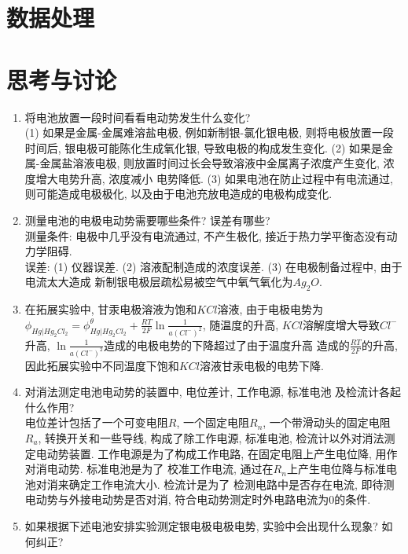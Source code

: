 \documentclass[a4paper]{article}
\begin{document}
\section{数据处理}

\newpage
\section{思考与讨论}
\begin{enumerate}
	\item 将电池放置一段时间看看电动势发生什么变化?\\
	(1) 如果是金属-金属难溶盐电极, 例如新制银-氯化银电极, 则将电极放置一段时间后, 
	银电极可能陈化生成氧化银, 导致电极的构成发生变化. (2) 如果是金属-金属盐溶液电极, 
	则放置时间过长会导致溶液中金属离子浓度产生变化, 浓度增大电势升高, 浓度减小
	电势降低. (3) 如果电池在防止过程中有电流通过, 则可能造成电极极化, 
	以及由于电池充放电造成的电极构成变化.
	\item 测量电池的电极电动势需要哪些条件? 误差有哪些?\\
	测量条件: 电极中几乎没有电流通过, 不产生极化, 接近于热力学平衡态没有动力学阻碍.\\
	误差: (1) 仪器误差. (2) 溶液配制造成的浓度误差. (3) 在电极制备过程中, 由于电流太大造成
	新制银电极层疏松易被空气中氧气氧化为$Ag_{2}O$.
	\item 在拓展实验中, 甘汞电极溶液为饱和$KCl$溶液, 由于电极电势为$\phi_{Hg|Hg_{2}Cl_{2}} 
	= \phi^{\theta}_{Hg|Hg_{2}Cl_{2}} + \frac{RT}{2F}\ln\frac{1}{a(Cl^{-})^{2}}$, 随温度的升高, 
	$KCl$溶解度增大导致$Cl^{-}$升高, $\ln\frac{1}{a(Cl^{-})^{2}}$造成的电极电势的下降超过了由于温度升高
	造成的$\frac{RT}{2F}$的升高, 因此拓展实验中不同温度下饱和$KCl$溶液甘汞电极的电势下降.
	\item 对消法测定电池电动势的装置中, 电位差计, 工作电源, 标准电池
	及检流计各起什么作用?\\
	电位差计包括了一个可变电阻$R$, 一个固定电阻$R_{n}$, 一个带滑动头的固定电阻$R_{a}$, 
	转换开关和一些导线, 构成了除工作电源, 标准电池, 检流计以外对消法测定电动势装置.
	工作电源是为了构成工作电路, 在固定电阻上产生电位降, 用作对消电动势.  标准电池是为了
	校准工作电流, 通过在$R_{n}$上产生电位降与标准电池对消来确定工作电流大小. 检流计是为了
	检测电路中是否存在电流, 即待测电动势与外接电动势是否对消, 符合电动势测定时外电路电流为0的条件.
	\item 如果根据下述电池安排实验测定银电极电极电势, 实验中会出现什么现象? 如何纠正? \\

\end{enumerate}
\end{document}
